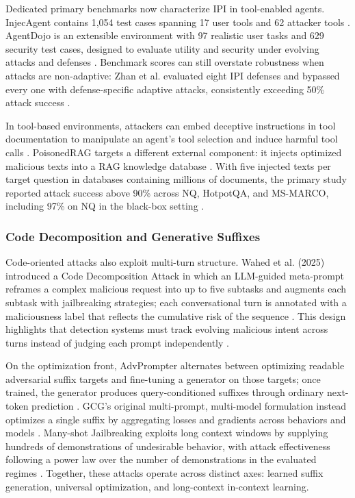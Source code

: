 \documentclass[11pt,a4paper]{article}
\begin{document}
Dedicated primary benchmarks now characterize IPI in tool-enabled agents. InjecAgent contains 1,054 test cases spanning 17 user tools and 62 attacker tools \cite{Zhan_2024_InjecAgent_49e6e6a4}. AgentDojo is an extensible environment with 97 realistic user tasks and 629 security test cases, designed to evaluate utility and security under evolving attacks and defenses \cite{Debenedetti_2024_AgentDojo_349884ff}. Benchmark scores can still overstate robustness when attacks are non-adaptive: Zhan et al. evaluated eight IPI defenses and bypassed every one with defense-specific adaptive attacks, consistently exceeding 50\% attack success \cite{Zhan_2025_LLM_ab9a7822}.

In tool-based environments, attackers can embed deceptive instructions in tool documentation to manipulate an agent's tool selection and induce harmful tool calls \cite{Shi_2025_LLM_f0833c22}. PoisonedRAG targets a different external component: it injects optimized malicious texts into a RAG knowledge database \cite{Zou_2025_PoisonedRAG_f4ff19ff}. With five injected texts per target question in databases containing millions of documents, the primary study reported attack success above 90\% across NQ, HotpotQA, and MS-MARCO, including 97\% on NQ in the black-box setting \cite{Zou_2025_PoisonedRAG_f4ff19ff}.

\subsubsection{Code Decomposition and Generative Suffixes}

Code-oriented attacks also exploit multi-turn structure. Wahed et al. (2025) introduced a Code Decomposition Attack in which an LLM-guided meta-prompt reframes a complex malicious request into up to five subtasks and augments each subtask with jailbreaking strategies; each conversational turn is annotated with a maliciousness label that reflects the cumulative risk of the sequence \cite{Wahed_2025_Mocha_c0ec2d2c}. This design highlights that detection systems must track evolving malicious intent across turns instead of judging each prompt independently \cite{Wahed_2025_Mocha_c0ec2d2c}.

On the optimization front, AdvPrompter alternates between optimizing readable adversarial suffix targets and fine-tuning a generator on those targets; once trained, the generator produces query-conditioned suffixes through ordinary next-token prediction \cite{Paulus_2025_AdvPrompter_d888b27b}. GCG's original multi-prompt, multi-model formulation instead optimizes a single suffix by aggregating losses and gradients across behaviors and models \cite{Zou_2023_Universal_ab8745c2}. Many-shot Jailbreaking exploits long context windows by supplying hundreds of demonstrations of undesirable behavior, with attack effectiveness following a power law over the number of demonstrations in the evaluated regimes \cite{Anil_2024_ManyShot_08d20dea}. Together, these attacks operate across distinct axes: learned suffix generation, universal optimization, and long-context in-context learning.
\end{document}

